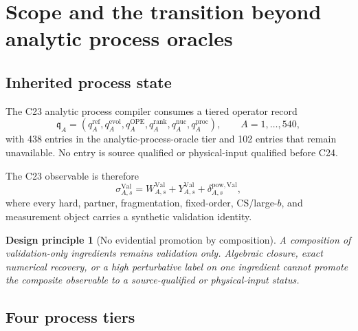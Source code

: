 \documentclass[11pt]{article}
\newtheorem{principle}[definition]{Design principle}
\newcommand{\CS}{\ensuremath{\mathrm{CS}}}
\newcommand{\Val}{\ensuremath{\mathrm{Val}}}
\begin{document}
\tableofcontents
\newpage

\section{Scope and the transition beyond analytic process oracles}
\label{sec:scope}

\subsection{Inherited process state}

The C23 analytic process compiler consumes a tiered operator record
\begin{equation}
 \mathfrak q_A
 =
 \left(
 q_A^{\mathrm{ref}},
 q_A^{\mathrm{evol}},
 q_A^{\mathrm{OPE}},
 q_A^{\mathrm{rank}},
 q_A^{\mathrm{nuc}},
 q_A^{\mathrm{proc}}
 \right),
 \qquad A=1,\ldots,540,
 \label{eq:inherited-capability}
\end{equation}
with 438 entries in the analytic-process-oracle tier and 102 entries that remain unavailable.  No entry is source qualified or physical-input qualified before C24.

The C23 observable is therefore
\begin{equation}
 \sigma_{A,s}^{\Val}
 =
 W_{A,s}^{\Val}
 +Y_{A,s}^{\Val}
 +\delta_{A,s}^{\mathrm{pow,Val}},
 \label{eq:c23-validation-observable}
\end{equation}
where every hard, partner, fragmentation, fixed-order, \CS/large-\(b\), and measurement object carries a synthetic validation identity.

\begin{principle}[No evidential promotion by composition]
A composition of validation-only ingredients remains validation only.  Algebraic closure, exact numerical recovery, or a high perturbative label on one ingredient cannot promote the composite observable to a source-qualified or physical-input status.
\end{principle}

\subsection{Four process tiers}
\end{document}
